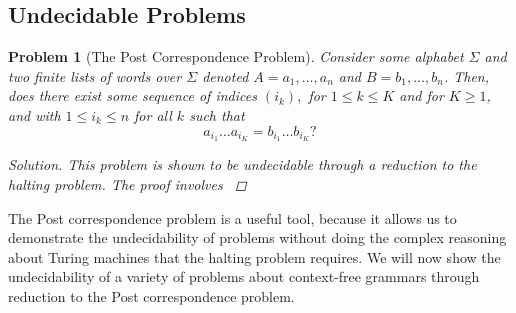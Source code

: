 \documentclass[psamsfonts]{amsart}
\newtheorem{prob}[thm]{Problem}
\theoremstyle{definition}
\theoremstyle{remark}
\numberwithin{equation}{section}
\begin{document}
\subsection{Undecidable Problems}
\begin{prob}[The Post Correspondence Problem]
  Consider some alphabet $\Sigma$ and two finite lists of words over $\Sigma$
  denoted $A = a_1,\dots,a_n$ and $B = b_1, \dots, b_n$. Then, does there exist
some sequence of indices $(i_k),$ for $1 \leq k \leq K$ and for
  $K\geq 1$, and with $1 \leq i_k \leq n$ for all $k$ such that
  \[
    a_{i_1}\dots a_{i_K} = b_{i_1}\dots b_{i_K}?
  \]
  \begin{proof}[Solution]
    This problem is shown to be undecidable through a reduction to the halting
    problem. The proof involves 
    \cite{sipser13:_introd_theor_comput}
  \end{proof}
\end{prob}

The Post correspondence problem is a useful tool, because it allows us to
demonstrate the undecidability of problems without doing the complex reasoning
about Turing machines that the halting problem requires. We will now show the
undecidability of a variety of problems about context-free grammars through
reduction to the Post correspondence problem.
\end{document}
